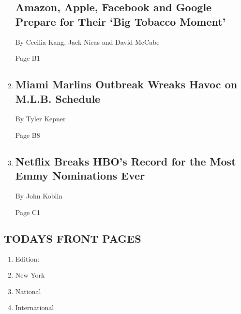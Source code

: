 \begin{enumerate}
  \hypertarget{amazon-apple-facebook-and-google-prepare-for-their-big-tobacco-moment}{%
  \subsection{Amazon, Apple, Facebook and Google Prepare for Their `Big
  Tobacco
  Moment'}\label{amazon-apple-facebook-and-google-prepare-for-their-big-tobacco-moment}}

  By Cecilia Kang, Jack Nicas and David McCabe

  Page B1
\item
  \href{/2020/07/28/sports/baseball/marlins-outbreak-mlb-coronavirus.html}{}

  \hypertarget{miami-marlins-outbreak-wreaks-havoc-on-mlb-schedule}{%
  \subsection{Miami Marlins Outbreak Wreaks Havoc on M.L.B.
  Schedule}\label{miami-marlins-outbreak-wreaks-havoc-on-mlb-schedule}}

  By Tyler Kepner

  Page B8
\item
  \href{/2020/07/28/arts/television/emmy-nominations.html}{}

  \hypertarget{netflix-breaks-hbos-record-for-the-most-emmy-nominations-ever}{%
  \subsection{Netflix Breaks HBO's Record for the Most Emmy Nominations
  Ever}\label{netflix-breaks-hbos-record-for-the-most-emmy-nominations-ever}}

  By John Koblin

  Page C1
\end{enumerate}

\hypertarget{todays-front-pages}{%
\subsection{TODAYS FRONT PAGES}\label{todays-front-pages}}

\begin{enumerate}
\def\labelenumi{\arabic{enumi}.}
\tightlist
\item
  Edition:
\item
  New York
\item
  National
\item
  International
\end{enumerate}

